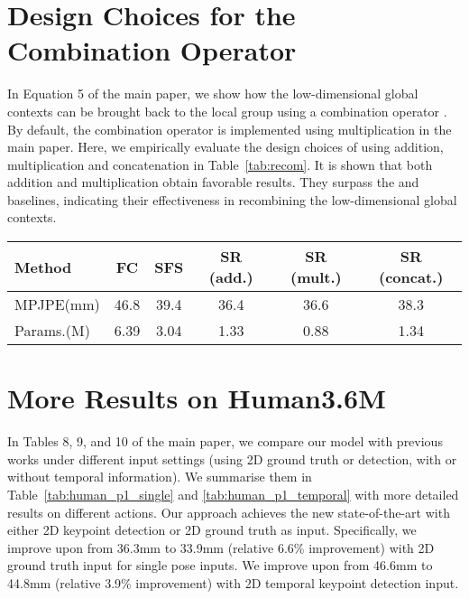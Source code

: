 \documentclass[runningheads]{llncs}
\begin{document}
\section{Design Choices for the Combination Operator}
\label{sec:recomb}
In Equation 5 of the main paper, we show how the low-dimensional global contexts can be brought back to the local group using a combination operator . By default, the combination operator  is implemented using multiplication in the main paper. Here, we empirically evaluate the design choices of using addition, multiplication and concatenation in Table~\ref{tab:recom}. It is shown that both addition and multiplication obtain favorable results. They surpass the  and  baselines, indicating their effectiveness in recombining the low-dimensional global contexts. 







\begin{table*}
\begin{center}
{
\begin{tabular}{ l| c |c ||c |c |c}
\hline
Method & FC& SFS &SR (add.)&SR (mult.) & SR (concat.)\\
\hline
MPJPE(mm)& 46.8&39.4&36.4&36.6&38.3\\
\hline
Params.(M)&6.39&3.04&1.33&0.88&1.34\\
\hline
\end{tabular}}
\end{center}
\caption{Comparison on different design choices for the combination operator under the
\emph{Subject} protocol. MPJPE is used as the evaluation metric. 2D ground truth is used as input. The third row shows the number of learnable parameters of different models.
}
\label{tab:recom}
\end{table*}







\section{More Results on Human3.6M}
\label{sec:p2}
In Tables 8, 9, and 10 of the main paper, we compare our model with previous works under different input settings (using 2D ground truth or detection, with or without temporal information). We summarise them in Table~\ref{tab:human_p1_single} and \ref{tab:human_p1_temporal} with more detailed results on different actions. Our approach achieves the new state-of-the-art with either 2D keypoint detection or 2D ground truth as input. Specifically, we improve upon \cite{ci2019optimizing} from 36.3mm to 33.9mm (relative 6.6\% improvement) with 2D ground truth input for single pose inputs. We improve upon \cite{lin2019trajectory} from 46.6mm to 44.8mm (relative 3.9\% improvement) with 2D temporal keypoint detection input. 
\end{document}
